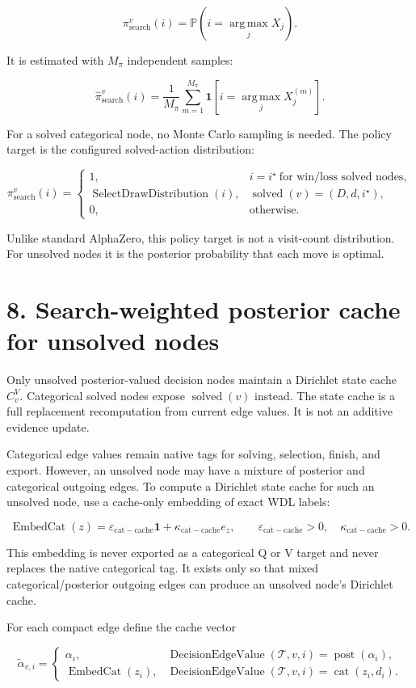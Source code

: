 \documentclass[11pt]{article}
\newcommand{\Prob}{\mathbb{P}}
\newcommand{\one}{\mathbf{1}}
\newcommand{\eps}{\varepsilon}
\newcommand{\argmax}{\operatorname*{arg\,max}}
\newcommand{\Tree}{\mathcal{T}}
\newcommand{\Solved}{\operatorname{solved}}
\newcommand{\Cat}{\operatorname{cat}}
\newcommand{\Posterior}{\operatorname{post}}
\newcommand{\EmbedCat}{\operatorname{EmbedCat}}
\newcommand{\SelectDrawDistribution}{\operatorname{SelectDrawDistribution}}
\newcommand{\DecisionEdgeValue}{\operatorname{DecisionEdgeValue}}
\begin{document}
\[
\pi_{\mathrm{search}}^v(i)
=
\Prob\left(
  i=\argmax_j X_j
\right).
\]

It is estimated with \(M_\pi\) independent samples:

\[
\hat\pi_{\mathrm{search}}^v(i)
=
\frac{1}{M_\pi}
\sum_{m=1}^{M_\pi}
\one\left[i=\argmax_j X_j^{(m)}\right].
\]

For a solved categorical node, no Monte Carlo sampling is needed. The policy
target is the configured solved-action distribution:

\[
\pi_{\mathrm{search}}^v(i)=
\begin{cases}
1,&i=i^\star\ \text{for win/loss solved nodes},\\
\SelectDrawDistribution(i),&\Solved(v)=(D,d,i^\star),\\
0,&\text{otherwise}.
\end{cases}
\]

Unlike standard AlphaZero, this policy target is not a visit-count distribution.
For unsolved nodes it is the posterior probability that each move is optimal.

\section*{8. Search-weighted posterior cache for unsolved nodes}

Only unsolved posterior-valued decision nodes maintain a Dirichlet state cache
\(C^V_v\). Categorical solved nodes expose \(\Solved(v)\) instead. The state
cache is a full replacement recomputation from current edge values. It is not an
additive evidence update.

Categorical edge values remain native tags for solving, selection, finish, and
export. However, an unsolved node may have a mixture of posterior and categorical
outgoing edges. To compute a Dirichlet state cache for such an unsolved node, use
a cache-only embedding of exact WDL labels:

\[
\EmbedCat(z)
=
\eps_{\mathrm{cat-cache}}\one
+
\kappa_{\mathrm{cat-cache}}e_z,
\qquad
\eps_{\mathrm{cat-cache}}>0,
\quad
\kappa_{\mathrm{cat-cache}}>0.
\]

This embedding is never exported as a categorical Q or V target and never
replaces the native categorical tag. It exists only so that mixed
categorical/posterior outgoing edges can produce an unsolved node's Dirichlet
cache.

For each compact edge define the cache vector

\[
\widetilde\alpha_{v,i}=
\begin{cases}
\alpha_i,&\DecisionEdgeValue(\Tree,v,i)=\Posterior(\alpha_i),\\[2pt]
\EmbedCat(z_i),&\DecisionEdgeValue(\Tree,v,i)=\Cat(z_i,d_i).
\end{cases}
\]
\end{document}
